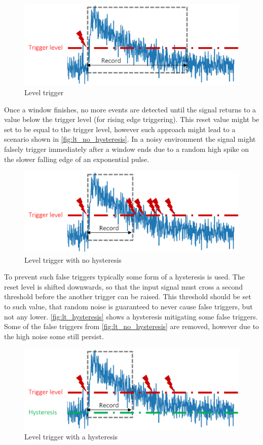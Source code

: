 \begin{figure}[H]
  \centering
  \includegraphics[width=.7\linewidth]{media/level_trigger.png}
  \caption{Level trigger}
  \label{fig:level_trigger}
\end{figure}


Once a window finishes, no more events are detected
until the signal returns to a value below the trigger level
(for rising edge triggering). This reset value might be 
set to be equal to the trigger level, however such approach
might lead to a scenario shown in \autoref{fig:lt_no_hysteresis}.
In a noisy environment the signal might falsely trigger immediately after
a window ends due to a random high spike on the slower falling edge of
an exponential pulse.
\begin{figure}[H]
  \centering
  \includegraphics[width=.7\linewidth]{media/lt_no_hysteresis.png}
  \caption{Level trigger with no hysteresis}
  \label{fig:lt_no_hysteresis}
\end{figure}


To prevent such false triggers typically some form of a hysteresis is used.
The reset level is shifted downwards, so that the input signal must cross
a second threshold before the another trigger can be raised.
This threshold should be set to such value, that random noise is guaranteed
to never cause false triggers, but not any lower.
\autoref{fig:lt_hysteresis} shows a hysteresis mitigating some false triggers.
Some of the false triggers from \autoref{fig:lt_no_hysteresis} are removed, however 
due to the high noise some still persist.
\begin{figure}[H]
  \centering
  \includegraphics[width=.7\linewidth]{media/lt_hysteresis.png}
  \caption{Level trigger with a hysteresis}
  \label{fig:lt_hysteresis} 
\end{figure}


